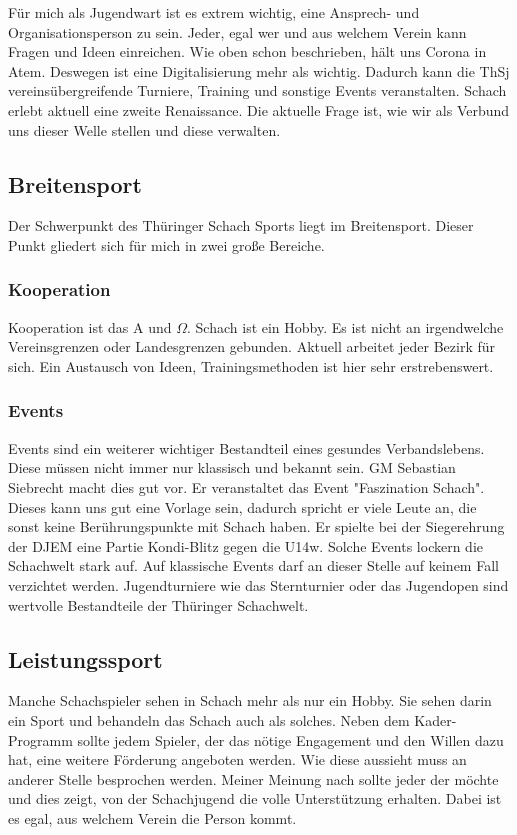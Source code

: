 \documentclass[letterpaper,12pt]{article}
\begin{document}
Für mich als Jugendwart ist es extrem wichtig, eine Ansprech- und Organisationsperson zu sein. Jeder, egal wer und aus welchem Verein kann Fragen und Ideen einreichen. Wie oben schon beschrieben, hält uns Corona in Atem. Deswegen ist eine Digitalisierung mehr als wichtig. Dadurch kann die ThSj vereinsübergreifende Turniere, Training und sonstige Events veranstalten. Schach erlebt aktuell eine zweite Renaissance. Die aktuelle Frage ist, wie wir als Verbund uns dieser Welle stellen und diese verwalten.


\subsection{Breitensport}

Der Schwerpunkt des Thüringer Schach Sports liegt im Breitensport. Dieser Punkt gliedert sich für mich in zwei große Bereiche.

\subsubsection{Kooperation}
Kooperation ist das A und $\Omega$. Schach ist ein Hobby. Es ist nicht an irgendwelche Vereinsgrenzen oder Landesgrenzen gebunden. Aktuell arbeitet jeder Bezirk für sich. Ein Austausch von Ideen, Trainingsmethoden ist hier sehr erstrebenswert.

\subsubsection{Events}
Events sind ein weiterer wichtiger Bestandteil eines gesundes Verbandslebens. Diese müssen nicht immer nur klassisch und bekannt sein. GM Sebastian Siebrecht macht dies gut vor. Er veranstaltet das Event "Faszination Schach". Dieses kann uns gut eine Vorlage sein, dadurch spricht er viele Leute an, die sonst keine Berührungspunkte mit Schach haben. Er spielte bei der Siegerehrung der DJEM eine Partie Kondi-Blitz gegen die U14w. Solche Events lockern die Schachwelt stark auf. Auf klassische Events darf an dieser Stelle auf keinem Fall verzichtet werden. Jugendturniere wie das Sternturnier oder das Jugendopen sind wertvolle Bestandteile der Thüringer Schachwelt. 

\subsection{Leistungssport}

Manche Schachspieler sehen in Schach mehr als nur ein Hobby. Sie sehen darin ein Sport und behandeln das Schach auch als solches. Neben dem Kader-Programm sollte jedem Spieler, der das nötige Engagement und den Willen dazu hat, eine weitere Förderung angeboten werden. Wie diese aussieht muss an anderer Stelle besprochen werden. Meiner Meinung nach sollte jeder der möchte und dies zeigt, von der Schachjugend die volle Unterstützung erhalten. Dabei ist es egal, aus welchem Verein die Person kommt.	
\end{document}

